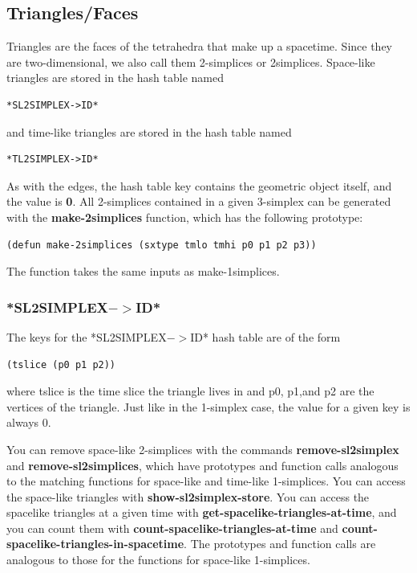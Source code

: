\documentclass[12pt]{article}
\begin{document}
\subsection{Triangles/Faces}
\label{s:data:tetrahedra}
Triangles are the faces of the tetrahedra that make up a
spacetime. Since they are two-dimensional, we also call them
2-simplices or 2simplices. Space-like triangles are stored in the hash
table named
\begin{lstlisting}
*SL2SIMPLEX->ID*
\end{lstlisting}
and time-like triangles are stored in the hash table named
\begin{lstlisting}
*TL2SIMPLEX->ID*
\end{lstlisting}

As with the edges, the hash table key contains the geometric object
itself, and the value is \textbf{0}. All 2-simplices contained in a
given 3-simplex can be generated with the \textbf{make-2simplices}
function, which has the following prototype:
\begin{lstlisting}
(defun make-2simplices (sxtype tmlo tmhi p0 p1 p2 p3))
\end{lstlisting}
The function takes the same inputs as make-1simplices.

\subsubsection{*SL2SIMPLEX$->$ID*}
The keys for the *SL2SIMPLEX$->$ID* hash table are of the form
\begin{lstlisting}
(tslice (p0 p1 p2))
\end{lstlisting}
where tslice is the time slice the triangle lives in and p0, p1,and p2
are the vertices of the triangle. Just like in the 1-simplex case, the
value for a given key is always 0. 

You can remove space-like 2-simplices with the commands
\textbf{remove-sl2simplex} and \textbf{remove-sl2simplices}, which
have prototypes and function calls analogous to the matching functions
for space-like and time-like 1-simplices. You can access the
space-like triangles with \textbf{show-sl2simplex-store}. You can
access the spacelike triangles at a given time with
\textbf{get-spacelike-triangles-at-time}, and you can count them with
\textbf{count-spacelike-triangles-at-time} and
\textbf{count-spacelike-triangles-in-spacetime}. The prototypes and
function calls are analogous to those for the functions for space-like
1-simplices.
\end{document}
